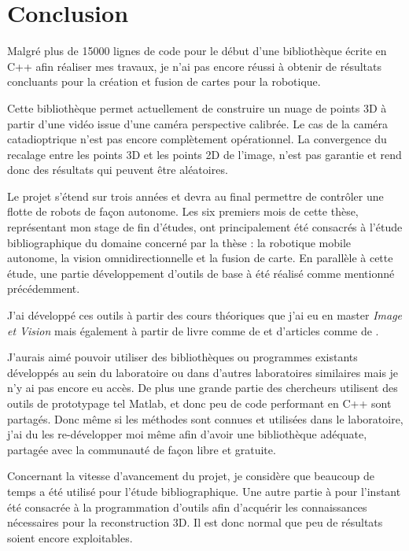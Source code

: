 \section{Conclusion}

Malgré plus de 15000 lignes de code pour le début d'une bibliothèque écrite en C++ afin réaliser mes travaux, je n'ai pas encore réussi à obtenir de résultats concluants pour la création et fusion de cartes pour la robotique.

Cette bibliothèque permet actuellement de construire un nuage de points 3D à partir d'une vidéo issue d'une caméra perspective calibrée.
Le cas de la caméra catadioptrique n'est pas encore complètement opérationnel.
La convergence du recalage entre les points 3D et les points 2D de l'image, n'est pas garantie et rend donc des résultats qui peuvent être aléatoires.

Le projet s'étend sur trois années et devra au final permettre de contrôler une flotte de robots de façon autonome.
Les six premiers mois de cette thèse, représentant mon stage de fin d'études, ont principalement été consacrés à l'étude bibliographique du domaine concerné par la thèse : la robotique mobile autonome, la vision omnidirectionnelle et la fusion de carte.
En parallèle à cette étude, une partie développement d'outils de base à été réalisé comme mentionné précédemment.

J'ai développé ces outils à partir des cours théoriques que j'ai eu en master \emph{Image et Vision} mais également à partir de livre comme 
de 
\citeauthor{Hartley03Book} 
\cite{Hartley03Book} 
et d'articles comme
de 
\citeauthor{Puig08} 
\cite{Puig08}.

J'aurais aimé pouvoir utiliser des bibliothèques ou programmes existants développés au sein du laboratoire ou dans d'autres laboratoires similaires mais je n'y ai pas encore eu accès.
De plus une grande partie des chercheurs utilisent des outils de prototypage tel Matlab, et donc peu de code performant en C++ sont partagés.
Donc même si les méthodes sont connues et utilisées dans le laboratoire, j'ai du les re-développer moi même afin d'avoir une bibliothèque adéquate, partagée avec la communauté de façon libre et gratuite.

Concernant la vitesse d'avancement du projet, je considère que beaucoup de temps a été utilisé pour l'étude bibliographique.
Une autre partie à pour l'instant été consacrée à la programmation d'outils afin d'acquérir les connaissances nécessaires pour la reconstruction 3D.
Il est donc normal que peu de résultats soient encore exploitables.
